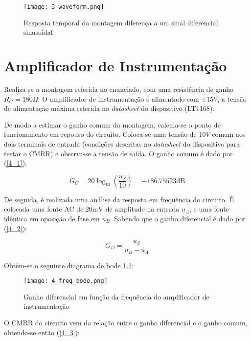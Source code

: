 \documentclass[a4paper, 2pt]{report}
\begin{document}
\begin{figure}[H]
    \centering
    \texttt{[image: 3\_waveform.png]}
    \caption{Resposta temporal da montagem diferença a um sinal diferencial sinusoidal}
    \label{3_wave}
\end{figure}



\chapter{Amplificador de Instrumentação}


\par Realiza-se a montagem referida no enunciado, com uma resistência de ganho \(R_G = 180\Omega\). O amplificador de instrumentação é alimentado com \(\pm 15V\), a tensão de alimentação máxima referida no \textit{datasheet} do dispositivo (LT1168).

\par De modo a estimar o ganho comum da montagem, calcula-se o ponto de funcionamento em repouso do circuito. Coloca-se uma tensão de \(10V\) comum aos dois terminais de entrada (condições descritas no \textit{datasheet} do dispositivo para testar o CMRR) e observa-se a tensão de saída. O ganho comum é dado por (\ref{4_1}):

\begin{equation}
    G_C = 20 \log_{10}(\frac{u_S}{10}) = -186.75523\text{dB}
    \label{4_1}
\end{equation}

\par De seguida, é realizada uma análise da resposta em frequência do circuito. É colocada uma fonte AC de \(20\text{mV}\) de amplitude na entrada \(u_A\), e uma fonte idêntica em oposição de fase em \(u_B\). Sabendo que o ganho diferencial é dado por (\ref{4_2}):

\begin{equation}
    G_D = \frac{u_S}{u_B - u_A}
    \label{4_2}
\end{equation}

\par Obtém-se o seguinte diagrama de bode \ref{4_bode}:

\begin{figure}[H]
    \centering
    \texttt{[image: 4\_freq\_bode.png]}
    \caption{Ganho diferencial em função da frequência do amplificador de instrumentação}
    \label{4_bode}
\end{figure}

\par O CMRR do circuito vem da relação entre o ganho diferencial e o ganho comum, obtendo-se então (\ref{4_3}):
\end{document}
